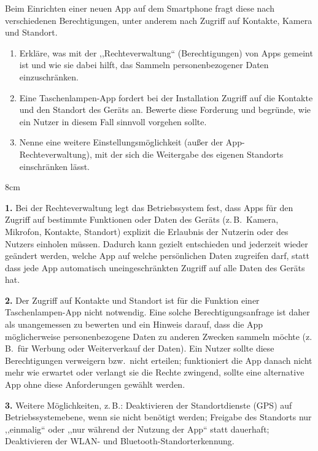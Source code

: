 \question[4]
Beim Einrichten einer neuen App auf dem Smartphone fragt diese nach 
verschiedenen Berechtigungen, unter anderem nach Zugriff auf Kontakte, 
Kamera und Standort.

\begin{enumerate}
    \item Erkläre, was mit der ,,Rechteverwaltung`` (Berechtigungen) 
    von Apps gemeint ist und wie sie dabei hilft, das Sammeln 
    personenbezogener Daten einzuschränken.
    \item Eine Taschenlampen-App fordert bei der Installation Zugriff 
    auf die Kontakte und den Standort des Geräts an. Bewerte diese 
    Forderung und begründe, wie ein Nutzer in diesem Fall sinnvoll 
    vorgehen sollte.
    \item Nenne eine weitere Einstellungsmöglichkeit (außer der 
    App-Rechteverwaltung), mit der sich die Weitergabe des eigenen 
    Standorts einschränken lässt.
\end{enumerate}

\begin{solutionbox}{8cm}

\textbf{1.} Bei der Rechteverwaltung legt das Betriebssystem fest, 
dass Apps für den Zugriff auf bestimmte Funktionen oder Daten des 
Geräts (z.\,B.\ Kamera, Mikrofon, Kontakte, Standort) explizit die 
Erlaubnis der Nutzerin oder des Nutzers einholen müssen. Dadurch kann 
gezielt entschieden und jederzeit wieder geändert werden, welche App 
auf welche persönlichen Daten zugreifen darf, statt dass jede App 
automatisch uneingeschränkten Zugriff auf alle Daten des Geräts hat.

\textbf{2.} Der Zugriff auf Kontakte und Standort ist für die 
Funktion einer Taschenlampen-App nicht notwendig. Eine solche 
Berechtigungsanfrage ist daher als unangemessen zu bewerten und ein 
Hinweis darauf, dass die App möglicherweise personenbezogene Daten zu 
anderen Zwecken sammeln möchte (z.\,B.\ für Werbung oder Weiterverkauf 
der Daten). Ein Nutzer sollte diese Berechtigungen verweigern bzw.\ 
nicht erteilen; funktioniert die App danach nicht mehr wie erwartet 
oder verlangt sie die Rechte zwingend, sollte eine alternative App 
ohne diese Anforderungen gewählt werden.

\textbf{3.} Weitere Möglichkeiten, z.\,B.: Deaktivieren der 
Standortdienste (GPS) auf Betriebssystemebene, wenn sie nicht benötigt 
werden; Freigabe des Standorts nur ,,einmalig`` oder ,,nur während der 
Nutzung der App`` statt dauerhaft; Deaktivieren der WLAN- und 
Bluetooth-Standorterkennung.

\end{solutionbox}